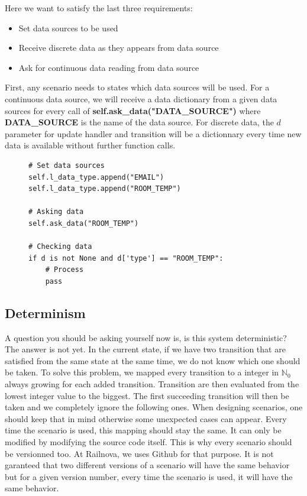 \documentclass[12pt]{article}
\theoremstyle{definition}
\theoremstyle{definition}
\theoremstyle{remark}
\begin{document}
Here we want to satisfy the last three requirements:
\begin{itemize}
\item Set data sources to be used
\item Receive discrete data as they appears from data source
\item Ask for continuous data reading from data source
\end{itemize}

First, any scenario needs to states which data sources will be used. For a continuous data source, we will receive a data dictionary from a given data sources for every call of \textbf{self.ask\_data("DATA\_SOURCE")} where \textbf{DATA\_SOURCE} is the name of the data source. For discrete data, the $d$ parameter for update handler and transition will be a dictionnary every time new data is available without further function calls.

\begin{figure}[H]
    \begin{lstlisting}[caption="Set data source",label={lst:python-data-sources}]
# Set data sources
self.l_data_type.append("EMAIL")
self.l_data_type.append("ROOM_TEMP")

# Asking data
self.ask_data("ROOM_TEMP")

# Checking data
if d is not None and d['type'] == "ROOM_TEMP":
    # Process
    pass
    \end{lstlisting}
\end{figure}


\subsection{Determinism}

A question you should be asking yourself now is, is this system deterministic? The answer is not yet. In the current state, if we have two transition that are satisfied from the same state at the same time, we do not know which one should be taken. To solve this problem, we mapped every transition to a integer in $\mathbb{N}_0$ always growing for each added transition. Transition are then evaluated from the lowest integer value to the biggest. The first succeeding transition will then be taken and we completely ignore the following ones. When designing scenarios, one should keep that in mind otherwise some unexpected cases can appear. Every time the scenario is used, this mapping should stay the same. It can only be modified by modifying the source code itself. This is why every scenario should be versionned too. At Railnova, we uses Github for that purpose. It is not garanteed that two different versions of a scenario will have the same behavior but for a given version number, every time the scenario is used, it will have the same behavior.
\end{document}
